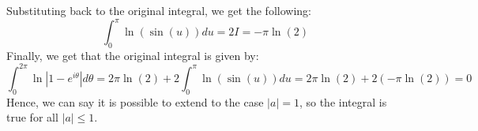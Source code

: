 \documentclass{article}
\begin{document}
Substituting back to the original integral, we get the following:
$$\int_{0}^{\pi}\ln(\sin(u))du = 2I = -\pi\ln(2)$$
Finally, we get that the original integral is given by:
$$\int_{0}^{2\pi}\ln|1-e^{i\theta}|d\theta = 2\pi\ln(2) + 2\int_{0}^{\pi}\ln(\sin(u))du = 2\pi\ln(2)+2(-\pi\ln(2))=0$$
Hence, we can say it is possible to extend to the case $|a|=1$, so the integral is true for all $|a|\leq 1$.
\end{document}
